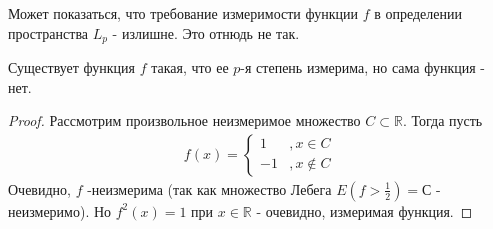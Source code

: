 Может показаться, что требование измеримости функции $f$ в определении пространства $L_p$ -  излишне. Это отнюдь не так.
\begin{statement}
	Существует функция $f$ такая, что ее $p$-я степень измерима, но сама функция - нет. 
\end{statement}

\begin{proof}
	Рассмотрим произвольное неизмеримое множество $C \subset \mathbb{R}$. Тогда пусть
	\begin{gather*}
		f(x) = 
		\begin{cases}
			1  &, x \in C \\
			-1 &, x \notin C
		\end{cases}
	\end{gather*}
	Очевидно, $f$ -неизмерима (так как множество Лебега $E(f > \frac{1}{2}) = С$ - неизмеримо). Но $f^2(x) = 1$ при $x \in \mathbb{R}$ - очевидно, измеримая функция.
\end{proof}

